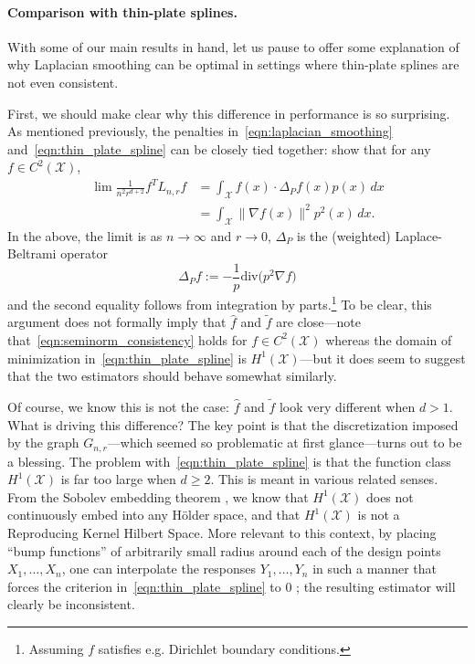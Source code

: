 \documentclass[twoside]{article}
\newcommand{\1}{\mathbf{1}}
\newcommand{\Lap}{L}
\newcommand{\Xset}{\mathcal{X}}
\newcommand{\dive}{\mathrm{div}}
\newcommand{\wt}[1]{\widetilde{#1}}
\newcommand{\wh}[1]{\widehat{#1}}
\theoremstyle{definition}
\theoremstyle{remark}
\begin{document}
\paragraph{Comparison with thin-plate splines.}
With some of our main results in hand, let us pause to offer some explanation of why Laplacian smoothing can be optimal in settings where thin-plate splines are not even consistent.  

First, we should make clear why this difference in performance is so surprising. As mentioned previously, the penalties in~\eqref{eqn:laplacian_smoothing} and~\eqref{eqn:thin_plate_spline} can be closely tied together: \citet{bousquet03} show that for any $f \in C^2(\Xset)$, 
\begin{equation}
\label{eqn:seminorm_consistency}
\begin{aligned}
\lim \frac{1}{n^2 r^{d + 2}} f^T \Lap_{n,r} f & = \int_{\Xset} f(x) \cdot \Delta_Pf(x) p(x) \,dx \\
& = \int_{\Xset} \|\nabla f(x)\|^2 p^2(x) \,dx.
\end{aligned}
\end{equation}
In the above, the limit is as $n \to \infty$ and $r \to 0$, $\Delta_P$ is the (weighted) Laplace-Beltrami operator
\begin{equation*}
\Delta_Pf := -\frac{1}{p} \dive\bigl(p^2\nabla f)
\end{equation*}
and the second equality follows from integration by parts.\footnote{Assuming $f$ satisfies e.g. Dirichlet boundary conditions.} To be clear, this argument does not formally imply that $\wh{f}$ and $\wt{f}$ are close---note that~\eqref{eqn:seminorm_consistency} holds for $f \in C^2(\Xset)$ whereas the domain of minimization in~\eqref{eqn:thin_plate_spline} is $H^1(\Xset)$---but it does seem to suggest that the two estimators should behave somewhat similarly. 

Of course, we know this is not the case: $\wh{f}$ and $\wt{f}$ look very different when $d > 1$. What is driving this difference? The key point is that the discretization imposed by the graph $G_{n,r}$---which seemed so problematic at first glance---turns out to be a blessing. The problem with~\eqref{eqn:thin_plate_spline} is that the function class $H^1(\Xset)$ is far too large when $d \geq 2$. This is meant in various related senses. From the Sobolev embedding theorem \citep{evans10}, we know that $H^1(\Xset)$ does not continuously embed into any H\"{o}lder space, and that $H^1(\Xset)$ is not a Reproducing Kernel Hilbert Space. More relevant to this context, by placing ``bump functions'' of arbitrarily small radius around each of the design points $X_1,\ldots,X_n$, one can interpolate the responses $Y_1,\ldots,Y_n$ in such a manner that forces the criterion in~\eqref{eqn:thin_plate_spline} to 0 \citep{green93}; the resulting estimator will clearly be inconsistent.
\end{document}
